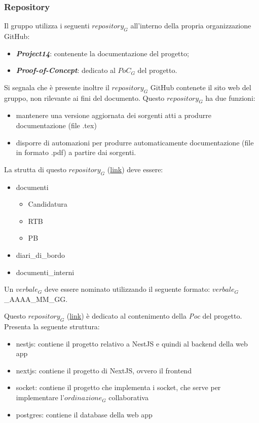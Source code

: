 \subsubsection{Repository}
Il gruppo utilizza i seguenti $\textit{repository}_G$ all'interno della propria organizzazione GitHub:
\begin{itemize}
    \item \emph{\textbf{Project14}}: contenente la documentazione del progetto;
    \item \emph{\textbf{Proof-of-Concept}}: dedicato al $\textit{PoC}_G$ del progetto.
\end{itemize}
Si segnala che è presente inoltre il $\textit{repository}_G$ GitHub contenete il sito web del gruppo, non rilevante ai fini del documento.
Questo $\textit{repository}_G$ ha due funzioni:
\begin{itemize}
    \item mantenere una versione aggiornata dei sorgenti atti a produrre documentazione (file .tex)
    \item disporre di automazioni per produrre automaticamente documentazione (file in formato .pdf) a partire dai sorgenti.
\end{itemize}
La strutta di questo $\textit{repository}_G$ (\href{https://github.com/RAMtastic6/Project14}{link}) deve essere:
\begin{itemize}
    \item documenti
    \begin{itemize}
        \item Candidatura
        \item RTB
        \item PB
    \end{itemize}
    \item diari\_di\_bordo
    \item documenti\_interni
\end{itemize}
Un $\textit{verbale}_G$ deve essere nominato utilizzando il seguente formato: $\textit{verbale}_G$\_AAAA\_MM\_GG.

Questo $\textit{repository}_G$ (\href{https://github.com/RAMtastic6/Proof-of-Concept}{link}) è dedicato al contenimento della \textit{Poc} del progetto. \\
Presenta la seguente struttura:
\begin{itemize}
    \item nestjs: contiene il progetto relativo a NestJS e quindi al backend della web app
    \item nextjs: contiene il progetto di NextJS, ovvero il frontend
    \item socket: contiene il progetto che implementa i socket, che serve per implementare l'$\textit{ordinazione}_G$ collaborativa
    \item postgres: contiene il database della web app
\end{itemize}

